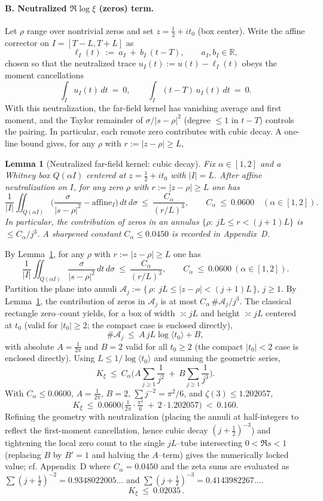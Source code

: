\documentclass[11pt]{article}
\newtheorem{lemma}[theorem]{Lemma}
\theoremstyle{definition}
\theoremstyle{remark}
\newcommand{\R}{\mathbb{R}}
\begin{document}
\paragraph{B. Neutralized $\Re\log\xi$ (zeros) term.}
Let $\rho$ range over nontrivial zeros and set $z=\tfrac12+it_0$ (box center). Write the affine corrector on $I=[T-L,T+L]$ as
\[
 \ell_I(t)\ :=\ a_I\ +\ b_I\,(t-T),\qquad a_I,b_I\in\R,
\]
chosen so that the neutralized trace $u_I(t):=u(t)-\ell_I(t)$ obeys the moment cancellations
\[
 \int_I u_I(t)\,dt\ =\ 0,\qquad \int_I (t-T)\,u_I(t)\,dt\ =\ 0.
\]
With this neutralization, the far-field kernel has vanishing average and first moment, and the Taylor remainder of $\sigma/|s-\rho|^2$ (degree $\le1$ in $t-T$) controls the pairing. In particular, each remote zero contributes with cubic decay. A one-line bound gives, for any $\rho$ with $r:=|z-\rho|\ge L$,
\begin{lemma}[Neutralized far-field kernel: cubic decay]\label{lem:neutralized-cubic}
Fix $\alpha\in[1,2]$ and a Whitney box $Q(\alpha I)$ centered at $z=\tfrac12+it_0$ with $|I|=L$. After affine neutralization on $I$, for any zero $\rho$ with $r:=|z-\rho|\ge L$ one has
\[
 \frac{1}{|I|}\iint_{Q(\alpha I)} \Big(\frac{\sigma}{|s-\rho|^2}-\text{affine}_I\Big)\,dt\,d\sigma\ \le\ \frac{C_\alpha}{(r/L)^3},\qquad C_\alpha\ \le\ 0.0600\quad (\alpha\in[1,2]).
\]
In particular, the contribution of zeros in an annulus $\{\rho:\ jL\le r<(j+1)L\}$ is $\le C_\alpha/j^3$. A sharpened constant $C_\alpha\le 0.0450$ is recorded in Appendix~D.
\end{lemma}
By Lemma~\ref{lem:neutralized-cubic}, for any $\rho$ with $r:=|z-\rho|\ge L$ one has
\[
\frac{1}{|I|}\iint_{Q(\alpha I)} \frac{\sigma}{|s-\rho|^2}\,dt\,d\sigma\ \le\ \frac{C_\alpha}{(r/L)^3},\qquad C_\alpha\ \le\ 0.0600\ (\alpha\in[1,2]).
\]
Partition the plane into annuli $\mathcal A_j:=\{\,\rho:\ jL\le |z-\rho|<(j+1)L\,\}$, $j\ge1$. By Lemma~\ref{lem:neutralized-cubic}, the contribution of zeros in $\mathcal A_j$ is at most $C_\alpha\,\#\mathcal A_j/j^3$. The classical rectangle zero–count yields, for a box of width $\asymp jL$ and height $\asymp jL$ centered at $t_0$ (valid for $|t_0|\ge 2$; the compact case is enclosed directly),
\[
\#\mathcal A_j\ \le\ A\,jL\log\langle t_0\rangle + B,
\]
with absolute $A=\tfrac1{2\pi}$ and $B=2$ valid for all $t_0\ge2$ (the compact $|t_0|<2$ case is enclosed directly). Using $L\le 1/\log\langle t_0\rangle$ and summing the geometric series,
\[
K_\xi\ \le\ C_\alpha\Big(A\sum_{j\ge1}\frac{1}{j^2}\ +\ B\sum_{j\ge1}\frac{1}{j^3}\Big).
\]
With $C_\alpha\le0.0600$, $A=\tfrac1{2\pi}$, $B=2$, $\sum j^{-2}=\pi^2/6$, and $\zeta(3)\le1.202057$,
\[
K_\xi\ \le\ 0.0600\Big(\tfrac{1}{2\pi}\cdot\tfrac{\pi^2}{6}\ +\ 2\cdot1.202057\Big)\ <\ 0.160.
\]
Refining the geometry with neutralization (placing the annuli at half-integers to reflect the first-moment cancellation, hence cubic decay $(j+\tfrac12)^{-3}$) and tightening the local zero count to the single $jL$–tube intersecting $0<\Re s<1$ (replacing $B$ by $B'=1$ and halving the $A$–term) gives the numerically locked value; cf. Appendix~D where $C_\alpha=0.0450$ and the zeta sums are evaluated as $\sum (j+\tfrac12)^{-2}=0.9348022005\ldots$ and $\sum (j+\tfrac12)^{-3}=0.4143982267\ldots$.
\[
\boxed{\,K_\xi\ \le\ 0.02035\,}.
\]
\end{document}
